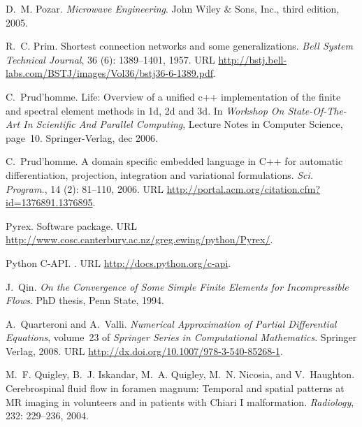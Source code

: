\begin{thebibliography}{467}
D.~M. Pozar.
\newblock \emph{Microwave Engineering}.
\newblock John Wiley \& Sons, Inc., third edition, 2005.

R.~C. Prim.
\newblock Shortest connection networks and some generalizations.
\newblock \emph{Bell System Technical Journal}, 36 (6):
  1389--1401, 1957.
\newblock URL
  \url{http://bstj.bell-labs.com/BSTJ/images/Vol36/bstj36-6-1389.pdf}.

C.~Prud'homme.
\newblock Life: Overview of a unified c++ implementation of the finite and
  spectral element methods in 1d, 2d and 3d.
\newblock In \emph{Workshop On State-Of-The-Art In Scientific And Parallel
  Computing}, Lecture Notes in Computer Science, page~10. Springer-Verlag, dec
  2006{}.

C.~Prud'homme.
\newblock A domain specific embedded language in {C++} for automatic
  differentiation, projection, integration and variational formulations.
\newblock \emph{Sci. Program.}, 14 (2): 81--110,
  2006{}.
\newblock URL \url{http://portal.acm.org/citation.cfm?id=1376891.1376895}.

Pyrex.
\newblock Software package.
\newblock URL \url{http://www.cosc.canterbury.ac.nz/greg.ewing/python/Pyrex/}.

Python C-API.
.
\newblock URL \url{http://docs.python.org/c-api}.

J.~Qin.
\newblock \emph{On the Convergence of Some Simple Finite Elements for
  Incompressible Flows}.
\newblock PhD thesis, Penn State, 1994.

A.~Quarteroni and A.~Valli.
\newblock \emph{Numerical Approximation of Partial Differential Equations},
  volume~23 of \emph{Springer Series in Computational Mathematics}.
\newblock Springer Verlag, 2008.
\newblock URL \url{http://dx.doi.org/10.1007/978-3-540-85268-1}.

M.~F. Quigley, B.~J. Iskandar, M.~A. Quigley, M.~N. Nicosia, and V.~Haughton.
\newblock Cerebrospinal fluid flow in foramen magnum: {T}emporal and spatial
  patterns at {MR} imaging in volunteers and in patients with {C}hiari {I}
  malformation.
\newblock \emph{Radiology}, 232: 229--236, 2004.


\end{thebibliography}
